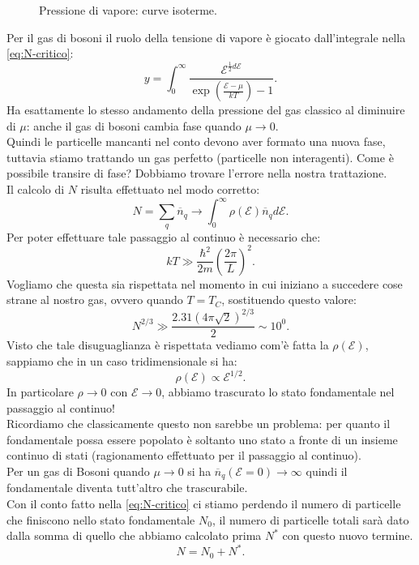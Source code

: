 \begin{figure}[H]
    \centering
    \caption{Pressione di vapore: curve isoterme.}
    \label{fig:pressione-di-vapore}
\end{figure}
\noindent
Per il gas di bosoni il ruolo della tensione di vapore è giocato dall'integrale nella \ref{eq:N-critico}:
\[
	y =\int_{0}^{\infty} \frac{\mathcal{E} ^{\frac{1}{2}d\mathcal{E} }}{\exp\left( \frac{\mathcal{E} -\mu }{kT} \right)-1 } 
.\] 
Ha esattamente lo stesso andamento della pressione del gas classico al diminuire di $\mu$: anche il gas di bosoni cambia fase quando $\mu \to 0$.\\
Quindi le particelle mancanti nel conto devono aver formato una nuova fase, tuttavia stiamo trattando un gas perfetto (particelle non interagenti). Come è possibile transire di fase? Dobbiamo trovare l'errore nella nostra trattazione.\\
Il calcolo di $N$ risulta effettuato nel modo corretto:
\[
    N = \sum_{q}^{} \overline{n}_{q} \to \int_{0}^{\infty} \rho (\mathcal{E}) \overline{n}_q d\mathcal{E}
.\] 
Per poter effettuare tale passaggio al continuo è necessario che:
\[
	kT \gg \frac{\hbar^2}{2m}\left( \frac{2\pi}{L} \right) ^2
.\]
Vogliamo che questa sia rispettata nel momento in cui iniziano a succedere cose strane al nostro gas, ovvero quando $T = T_{C}$, sostituendo questo valore:
\[
	N^{2 /3} \gg \frac{2.31 \left( 4\pi\sqrt{2}  \right)^{2 /3}}{2} \sim 10^0
.\] 
Visto che tale disuguaglianza è rispettata vediamo com'è fatta la $\rho ( \mathcal{E} ) $, sappiamo che in un caso tridimensionale si ha:
\[
	\rho ( \mathcal{E} ) \propto \mathcal{E} ^{1 /2}
.\] 
In particolare $\rho \to 0$ con $\mathcal{E} \to 0$, abbiamo trascurato lo stato fondamentale nel passaggio al continuo!\\
Ricordiamo che classicamente questo non sarebbe un problema: per quanto il fondamentale possa essere popolato è soltanto uno stato a fronte di un insieme continuo di stati (ragionamento effettuato per il passaggio al continuo). \\
Per un gas di Bosoni quando $\mu \to 0$ si ha $\overline{n}_{q}( \mathcal{E} = 0)  \to \infty$ quindi il fondamentale diventa tutt'altro che trascurabile.\\
Con il conto fatto nella \ref{eq:N-critico} ci stiamo perdendo il numero di particelle che finiscono nello stato fondamentale $N_0$, il numero di particelle totali sarà dato dalla somma di quello che abbiamo calcolato prima $N^{*}$ con questo nuovo termine.
\[
	N = N_0 + N^{*}
.\] 
